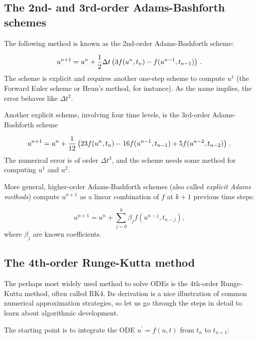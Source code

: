 \documentclass[%
oneside,                 %
final,                   %
10pt]{article}
\begin{document}
\subsection{The 2nd- and 3rd-order Adams-Bashforth schemes}


The following method is known as the 2nd-order Adams-Bashforth scheme:

\begin{equation}
u^{n+1} = u^n + \frac{1}{2}\Delta t\left( 3f(u^n, t_n) - f(u^{n-1}, t_{n-1})
\right)
\thinspace .
\label{decay:fd2:AB2}
\end{equation}
The scheme is explicit and requires another one-step scheme to compute
$u^1$ (the Forward Euler scheme or Heun's method, for instance).
As the name implies, the error behaves like $\Delta t^2$.



Another explicit scheme, involving four time levels, is the
3rd-order Adams-Bashforth scheme

\begin{equation}
u^{n+1} = u^n + \frac{1}{12}\left( 23f(u^n, t_n) - 16 f(u^{n-1},t_{n-1})
+ 5f(u^{n-2}, t_{n-2})\right)
\thinspace .
\label{decay:fd2:AB3}
\end{equation}
The numerical error is of order $\Delta t^3$, and the scheme needs
some method for computing $u^1$ and $u^2$.

More general, higher-order Adams-Bashforth schemes (also called
\emph{explicit Adams methods}) compute $u^{n+1}$ as a linear combination
of $f$ at $k+1$ previous time steps:

\[ u^{n+1} = u^n + \sum_{j=0}^k \beta_jf(u^{n-j},t_{n-j}),\]
where $\beta_j$ are known coefficients.


\subsection{The 4th-order Runge-Kutta method}
\label{decay:fd2:RK4}


The perhaps most widely used method to solve ODEs is the 4th-order
Runge-Kutta method, often called RK4.
Its derivation is a nice illustration of common
numerical approximation strategies, so let us go through the
steps in detail to learn about algorithmic development.

The starting point is to integrate the ODE
$u^{\prime}=f(u,t)$ from $t_n$ to $t_{n+1}$:
\end{document}
